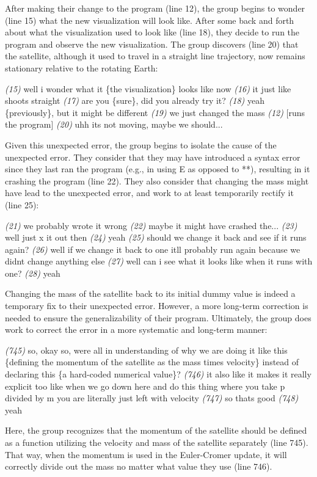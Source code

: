 \documentclass{msuphddissertation}
\begin{document}
\begin{doublespace}
After making their change to the program (line 12), the group begins to wonder (line 15) what the new visualization will look like.  After some back and forth about what the visualization used to look like (line 18), they decide to run the program and observe the new visualization.  The group discovers (line 20) that the satellite, although it used to travel in a straight line trajectory, now remains stationary relative to the rotating Earth:\begin{description}
\SA \textit{(15)} well i wonder what it \{the visualization\} looks like now
\SD \textit{(16)} it just like shoots straight
\SA \textit{(17)} are you \{sure\}, did you already try it?
\SC \textit{(18)} yeah \{previously\}, but it might be different
\SD \textit{(19)} we just changed the mass
\SC \textit{(12)} [runs the program]
\SA \textit{(20)} uhh its not moving, maybe we should...\end{description}  Given this unexpected error, the group begins to isolate the cause of the unexpected error.  They consider that they may have introduced a syntax error since they last ran the program (e.g., in using E as opposed to **), resulting in it crashing the program (line 22).  They also consider that changing the mass might have lead to the unexpected error, and work to at least temporarily rectify it (line 25): \begin{description}
\SC \textit{(21)} we probably wrote it wrong
\SC \textit{(22)} maybe it might have crashed the...
\SA \textit{(23)} well just x it out then
\SD \textit{(24)} yeah
\SD \textit{(25)} should we change it back and see if it runs again?
\SC \textit{(26)} well if we change it back to one itll probably run again because we didnt change anything else
\SA \textit{(27)} well can i see what it looks like when it runs with one?
\SC \textit{(28)} yeah
\end{description}

Changing the mass of the satellite back to its initial dummy value is indeed a temporary fix to their unexpected error.  However, a more long-term correction is needed to ensure the generalizability of their program.  Ultimately, the group does work to correct the error in a more systematic and long-term manner: \begin{description}
\SB \textit{(745)} so, okay so, were all in understanding of why we are doing it like this \{defining the momentum of the satellite as the mass times velocity\} instead of declaring this \{a hard-coded numerical value\}?
\SB \textit{(746)} it also like it makes it really explicit too like when we go down here and do this thing where you take p divided by m you are literally just left with velocity
\SB \textit{(747)} so thats good
\SD \textit{(748)} yeah\end{description}  Here, the group recognizes that the momentum of the satellite should be defined as a function utilizing the velocity and mass of the satellite separately (line 745).  That way, when the momentum is used in the Euler-Cromer update, it will correctly divide out the mass no matter what value they use (line 746). 


\end{doublespace}
\end{document}

